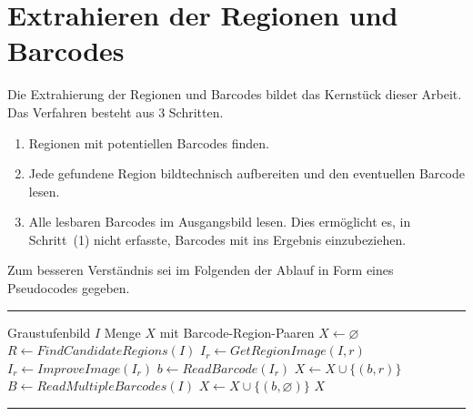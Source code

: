 \section{Extrahieren der Regionen und Barcodes}
\writtenby{\dcauthornameewie}%
%
Die Extrahierung der Regionen und Barcodes bildet das Kernstück dieser Arbeit.
Das Verfahren besteht aus 3 Schritten.
%
\begin{enumerate}[(1)]
\item Regionen mit potentiellen Barcodes finden.
\item Jede gefundene Region bildtechnisch aufbereiten und den eventuellen Barcode lesen.
\item Alle lesbaren Barcodes im Ausgangsbild lesen.
Dies ermöglicht es, in Schritt~(1) nicht erfasste, Barcodes mit ins Ergebnis einzubeziehen.
\end{enumerate}
%
Zum besseren Verständnis sei im Folgenden der Ablauf in Form eines Pseudocodes gegeben.
%
\vspace{1em}
\hrule
\vspace{0.5em}
\begin{algorithmic}
\Require Graustufenbild $I$
\Ensure Menge $X$ mit Barcode-Region-Paaren
\State $X\gets\varnothing$
\State $R\gets FindCandidateRegions(I)$
  \State $I_r\gets GetRegionImage(I,r)$
  \State $I_r\gets ImproveImage(I_r)$
  \State $b\gets ReadBarcode(I_r)$
  \State $X\gets X\cup \{(b,r)\}$
\EndFor
\State $B\gets ReadMultipleBarcodes(I)$
    \State $X\gets X\cup \{(b,\varnothing)\}$
  \EndIf
\EndFor
\State\Return $X$
\end{algorithmic}
\vspace{0.5em}
\hrule
\vspace{1em}
